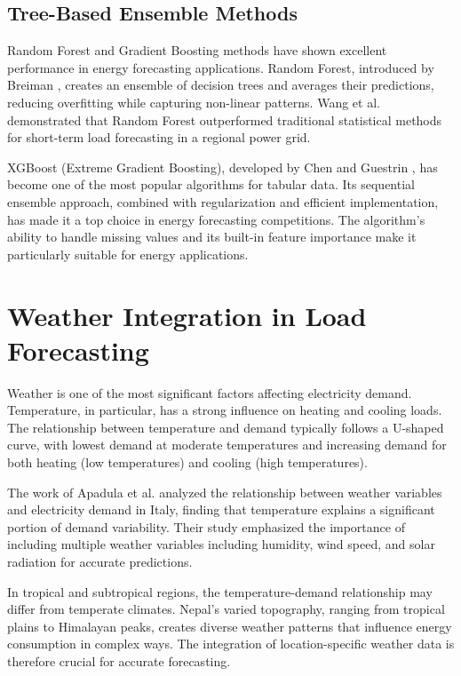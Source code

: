         \subsection{Tree-Based Ensemble Methods}
        Random Forest and Gradient Boosting methods have shown excellent performance in energy forecasting applications. Random Forest, introduced by Breiman \cite{breiman2001random}, creates an ensemble of decision trees and averages their predictions, reducing overfitting while capturing non-linear patterns. Wang et al. \cite{wang2018application} demonstrated that Random Forest outperformed traditional statistical methods for short-term load forecasting in a regional power grid.

        XGBoost (Extreme Gradient Boosting), developed by Chen and Guestrin \cite{chen2016xgboost}, has become one of the most popular algorithms for tabular data. Its sequential ensemble approach, combined with regularization and efficient implementation, has made it a top choice in energy forecasting competitions. The algorithm's ability to handle missing values and its built-in feature importance make it particularly suitable for energy applications.

    \section{Weather Integration in Load Forecasting}
        Weather is one of the most significant factors affecting electricity demand. Temperature, in particular, has a strong influence on heating and cooling loads. The relationship between temperature and demand typically follows a U-shaped curve, with lowest demand at moderate temperatures and increasing demand for both heating (low temperatures) and cooling (high temperatures).

        The work of Apadula et al. \cite{apadula2012relationships} analyzed the relationship between weather variables and electricity demand in Italy, finding that temperature explains a significant portion of demand variability. Their study emphasized the importance of including multiple weather variables including humidity, wind speed, and solar radiation for accurate predictions.

        In tropical and subtropical regions, the temperature-demand relationship may differ from temperate climates. Nepal's varied topography, ranging from tropical plains to Himalayan peaks, creates diverse weather patterns that influence energy consumption in complex ways. The integration of location-specific weather data is therefore crucial for accurate forecasting.

